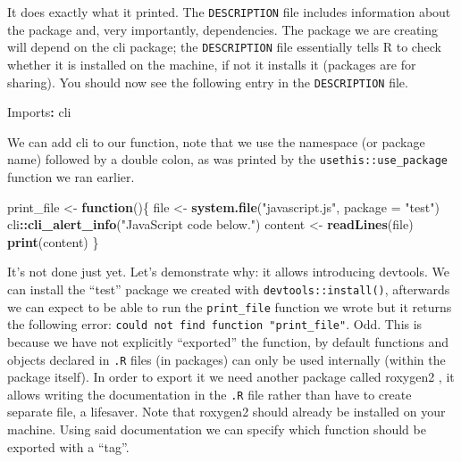 \documentclass[
]{krantz}
\makeatletter
\newenvironment{Shaded}{\begin{snugshade}}{\end{snugshade}}
\newcommand{\ControlFlowTok}[1]{\textcolor[rgb]{0.27,0.27,0.27}{\textbf{#1}}}
\newcommand{\DataTypeTok}[1]{\textcolor[rgb]{0.27,0.27,0.27}{#1}}
\newcommand{\KeywordTok}[1]{\textcolor[rgb]{0.27,0.27,0.27}{\textbf{#1}}}
\newcommand{\NormalTok}[1]{#1}
\newcommand{\OperatorTok}[1]{\textcolor[rgb]{0.43,0.43,0.43}{\textbf{#1}}}
\newcommand{\StringTok}[1]{\textcolor[rgb]{0.5,0.5,0.5}{#1}}
\newenvironment{kframe}{%
\medskip{}
\setlength{\fboxsep}{.8em}
 \def\at@end@of@kframe{}%
 \ifinner\ifhmode%
  \def\at@end@of@kframe{\end{minipage}}%
  \begin{minipage}{\columnwidth}%
 \fi\fi%
 \def\FrameCommand##1{\hskip\@totalleftmargin \hskip-\fboxsep
 \colorbox{shadecolor}{##1}\hskip-\fboxsep
     \hskip-\linewidth \hskip-\@totalleftmargin \hskip\columnwidth}%
 \MakeFramed {\advance\hsize-\width
   \@totalleftmargin\z@ \linewidth\hsize
   \@setminipage}}%
 {\par\unskip\endMakeFramed%
 \at@end@of@kframe}
\renewenvironment{Shaded}{\begin{kframe}}{\end{kframe}}
\makeatother
\begin{document}
It does exactly what it printed. The \texttt{DESCRIPTION} file includes information about the package and, very importantly, dependencies. The package we are creating will depend on the cli package; the \texttt{DESCRIPTION} file essentially tells R to check whether it is installed on the machine, if not it installs it (packages are for sharing). You should now see the following entry in the \texttt{DESCRIPTION} file.

\begin{Shaded}
\begin{Highlighting}[]
\NormalTok{Imports}\OperatorTok{:}\StringTok{ }
\StringTok{    }\NormalTok{cli}
\end{Highlighting}
\end{Shaded}

We can add cli to our function, note that we use the namespace (or package name) followed by a double colon, as was printed by the \texttt{usethis::use\_package} function we ran earlier.

\begin{Shaded}
\begin{Highlighting}[]
\NormalTok{print\_file <{-}}\StringTok{ }\ControlFlowTok{function}\NormalTok{()\{}
\NormalTok{  file <{-}}\StringTok{ }\KeywordTok{system.file}\NormalTok{(}\StringTok{"javascript.js"}\NormalTok{, }\DataTypeTok{package =} \StringTok{"test"}\NormalTok{)}
\NormalTok{  cli}\OperatorTok{::}\KeywordTok{cli\_alert\_info}\NormalTok{(}\StringTok{"JavaScript code below."}\NormalTok{)}
\NormalTok{  content <{-}}\StringTok{ }\KeywordTok{readLines}\NormalTok{(file)}
  \KeywordTok{print}\NormalTok{(content)}
\NormalTok{\}}
\end{Highlighting}
\end{Shaded}

It's not done just yet. Let's demonstrate why: it allows introducing devtools. We can install the ``test'' package we created with \texttt{devtools::install()}, afterwards we can expect to be able to run the \texttt{print\_file} function we wrote but it returns the following error: \texttt{could\ not\ find\ function\ "print\_file"}. Odd. This is because we have not explicitly ``exported'' the function, by default functions and objects declared in \texttt{.R} files (in packages) can only be used internally (within the package itself). In order to export it we need another package called roxygen2 \citep{R-roxygen2}, it allows writing the documentation in the \texttt{.R} file rather than have to create separate file, a lifesaver. Note that roxygen2 should already be installed on your machine. Using said documentation we can specify which function should be exported with a ``tag''.
\end{document}
